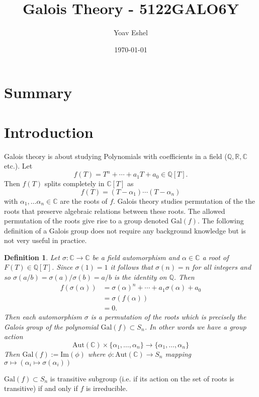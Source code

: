 \documentclass{article}
\title{Galois Theory - 5122GALO6Y}
\author{Yoav Eshel}
\date{\today}
\newcommand{\R}{\mathbb{R}}
\newcommand{\C}{\mathbb{C}}
\newcommand{\Q}{\mathbb{Q}}
\newtheorem*{definition}{Definition}
\theoremstyle{remark}
\begin{document}
    \maketitle
    \tableofcontents
    \newpage
    \section{Summary}
    \section{Introduction}
    Galois theory is about studying Polynomials with coefficients in a field ($\Q,\R,\C$ etc.).
    Let
    $$
        f(T) = T^n+\cdots+a_1T+a_0\in\Q[T].
    $$
    Then $f(T)$ splits completely in $\C[T]$ as
    $$
        f(T)=(T-\alpha_1)\cdots(T-\alpha_n)
    $$
    with $\alpha_1,\dots \alpha_n\in\C$ are the roots of $f$. Galois theory studies permutation of the the roots that preserve algebraic relations between these roots.
    The allowed permutation of the roots give rise to a group denoted $\text{Gal}(f)$.
    The following definition of a Galois group does not require any background knowledge but is not very useful in practice.

    \begin{definition}
        Let $\sigma:\C\to\C$ be a field automorphism and $\alpha\in\C$ a root of $F(T)\in\Q[T]$. Since $\sigma(1)=1$ it follows that $\sigma(n)=n$ for all integers and so $\sigma(a/b)=\sigma(a)/\sigma(b)=a/b$ is the identity on $\Q$.
        Then
        \begin{align*}
            f(\sigma(\alpha))&=\sigma(\alpha)^n+\cdots+a_1\sigma(\alpha)+a_0\\
            &=\sigma(f(\alpha))\\
            &=0.
        \end{align*}
        Then each automorphism $\sigma$ is a permutation of the roots which is precisely the Galois group of the polynomial $\text{Gal}(f)\subset S_n$.
        In other words we have a group action 
        $$
        \text{Aut}(\C)\times\{\alpha_1,\dots,\alpha_n\}\to\{\alpha_1,\dots,\alpha_n\}
        $$
        Then $\text{Gal}(f):=\text{Im}(\phi)$ where $\phi:\text{Aut}(\C)\to S_n$ mapping $\sigma\mapsto(\alpha_i\mapsto \sigma(\alpha_i))$
    \end{definition}

    $\text{Gal}(f)\subset S_n$ is transitive subgroup (i.e. if its action on the set of roots is transitive) if and only if $f$ is irreducible.
    
\end{document}
